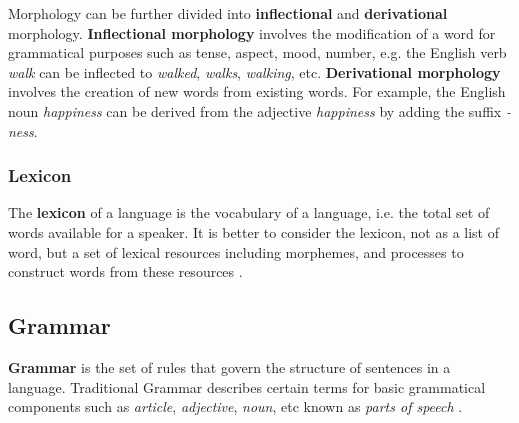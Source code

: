 Morphology can be further divided into \textbf{inflectional} and \textbf{derivational} morphology. \textbf{Inflectional morphology} involves the
modification of a word for grammatical purposes such as tense, aspect, mood, number, e.g. the English verb \textit{walk} can be inflected to
\textit{walked}, \textit{walks}, \textit{walking}, etc. \textbf{Derivational morphology} involves the creation of new words from existing words.
For example, the English noun \textit{happiness} can be derived from the adjective \textit{happiness} by adding the suffix \textit{-ness}.

\subsubsection{Lexicon}
The \textbf{lexicon} of a language is the vocabulary of a language, i.e. the total set of words available for a speaker. It is better to consider
the lexicon, not as a list of word, but a set of lexical resources including morphemes, and processes to construct words from these resources \cite{trask2007language}.

\subsection{Grammar}
\textbf{Grammar} is the set of rules that govern the structure of sentences in a language. Traditional Grammar describes certain terms for basic
grammatical components such as \textit{article}, \textit{adjective}, \textit{noun}, etc known as \textit{parts of speech} \cite{yule2020StudyLanguage}.

